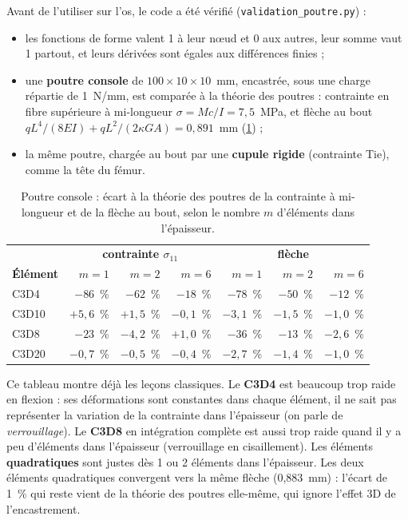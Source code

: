 \documentclass[11pt,a4paper]{article}
\newcommand{\fichier}[1]{\texttt{\small #1}}
\begin{document}
Avant de l'utiliser sur l'os, le code a été vérifié (\fichier{validation\_poutre.py}) :
\begin{itemize}
  \item les fonctions de forme valent 1 à leur nœud et 0 aux autres, leur somme vaut 1 partout, et leurs dérivées sont
  égales aux différences finies ;
  \item une \textbf{poutre console} de $100 \times 10 \times 10$~mm, encastrée, sous une charge répartie de 1~N/mm, est
  comparée à la théorie des poutres : contrainte en fibre supérieure à mi-longueur
  $\sigma = M c / I = 7{,}5$~MPa, et flèche au bout $q L^4 / (8EI) + q L^2 / (2\kappa G A) = 0{,}891$~mm
  (\cref{tab-poutre}) ;
  \item la même poutre, chargée au bout par une \textbf{cupule rigide} (contrainte Tie), comme la tête du fémur.
\end{itemize}

\begin{table}[h]
\centering\small
\caption{Poutre console : écart à la théorie des poutres de la contrainte à mi-longueur et de la flèche au bout,
selon le nombre $m$ d'éléments dans l'épaisseur.}
\label{tab-poutre}
\begin{tabular}{lrrrrrr}
\toprule
& \multicolumn{3}{c}{\textbf{contrainte $\sigma_{11}$}} & \multicolumn{3}{c}{\textbf{flèche}} \\
\textbf{Élément} & $m = 1$ & $m = 2$ & $m = 6$ & $m = 1$ & $m = 2$ & $m = 6$ \\
\midrule
C3D4 & $-86$~\% & $-62$~\% & $-18$~\% & $-78$~\% & $-50$~\% & $-12$~\% \\
C3D10 & $+5{,}6$~\% & $+1{,}5$~\% & $-0{,}1$~\% & $-3{,}1$~\% & $-1{,}5$~\% & $-1{,}0$~\% \\
C3D8 & $-23$~\% & $-4{,}2$~\% & $+1{,}0$~\% & $-36$~\% & $-13$~\% & $-2{,}6$~\% \\
C3D20 & $-0{,}7$~\% & $-0{,}5$~\% & $-0{,}4$~\% & $-2{,}7$~\% & $-1{,}4$~\% & $-1{,}0$~\% \\
\bottomrule
\end{tabular}
\end{table}

Ce tableau montre déjà les leçons classiques. Le \textbf{C3D4} est beaucoup trop raide en flexion : ses déformations
sont constantes dans chaque élément, il ne sait pas représenter la variation de la contrainte dans l'épaisseur
(on parle de \emph{verrouillage}). Le \textbf{C3D8} en intégration complète est aussi trop raide quand il y a peu
d'éléments dans l'épaisseur (verrouillage en cisaillement). Les éléments \textbf{quadratiques} sont justes dès 1 ou
2 éléments dans l'épaisseur. Les deux éléments quadratiques convergent vers la même flèche (0,883~mm) : l'écart de 1~\%
qui reste vient de la théorie des poutres elle-même, qui ignore l'effet 3D de l'encastrement.
\end{document}
